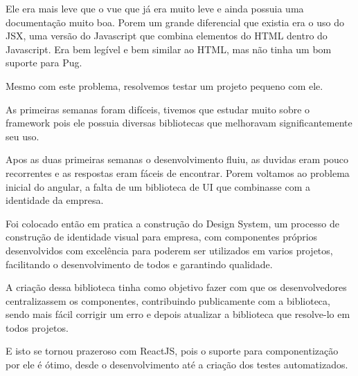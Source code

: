 Ele era mais leve que o vue que já era muito leve e ainda possuia uma documentação muito boa.
Porem um grande diferencial que existia era o uso do JSX, uma versão do Javascript que combina elementos do HTML dentro do Javascript. Era bem legível e bem similar ao HTML, mas não tinha um bom suporte para Pug.

Mesmo com este problema, resolvemos testar um projeto pequeno com ele. 

As primeiras semanas foram difíceis, tivemos que estudar muito sobre o framework pois ele possuia diversas bibliotecas que melhoravam significantemente seu uso.

Apos as duas primeiras semanas o desenvolvimento fluiu, as duvidas eram pouco recorrentes e as respostas eram fáceis de encontrar. Porem voltamos ao problema inicial do angular, 
a falta de um biblioteca de UI que combinasse com a identidade da empresa.

Foi colocado então em pratica a construção do Design System, um processo de construção de identidade visual para empresa, com componentes próprios desenvolvidos com excelência para poderem ser utilizados em varios projetos, facilitando o desenvolvimento de todos e garantindo qualidade.

A criação dessa biblioteca tinha como objetivo fazer com que os desenvolvedores centralizassem os componentes, contribuindo publicamente com a biblioteca, sendo mais fácil corrigir um erro e depois atualizar a biblioteca que resolve-lo em todos projetos.

E isto se tornou prazeroso com ReactJS, pois o suporte para componentização por ele é ótimo, desde o desenvolvimento até a criação dos testes automatizados.
